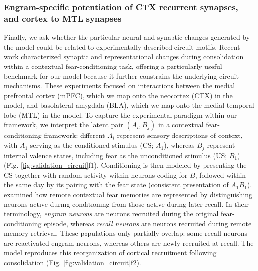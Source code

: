 \documentclass{article}
\begin{document}
\subsubsection*{Engram-specific potentiation of CTX recurrent synapses, and cortex to MTL synapses}
Finally, we ask whether the particular neural and synaptic changes generated by the model could be related to experimentally described circuit motifs. Recent work  characterized synaptic and representational changes during consolidation within a contextual fear-conditioning task, offering a particularly useful benchmark for our model because it further constrains the underlying circuit mechanisms. These experiments focused on interactions between the medial prefrontal cortex (mPFC), which we map onto the neocortex (CTX) in the model, and basolateral amygdala (BLA), which we map onto the medial temporal lobe (MTL) in the model. To capture the experimental paradigm within our framework, we interpret the latent pair $(A_i,B_j)$ in a contextual fear-conditioning framework: different $A_i$ represent sensory descriptions of context, with $A_1$ serving as the conditioned stimulus (CS; $A_1$), whereas $B_j$ represent internal valence states, including fear as the unconditioned stimulus (US; $B_1$) (Fig. \ref{fig:validation_circuit}f1). Conditioning is then modeled by presenting the CS together with random activity within neurons coding for $B$, followed within the same day by its pairing with the fear state (consistent presentation of $A_1B_1$).
\newline\newline
{} examined how remote contextual fear memories are represented by distinguishing neurons active during conditioning from those active during later recall. In their terminology, \emph{engram neurons} are neurons recruited during the original fear-conditioning episode, whereas \emph{recall neurons} are neurons recruited during remote memory retrieval. These populations only partially overlap: some recall neurons are reactivated engram neurons, whereas others are newly recruited at recall. The model reproduces this reorganization of cortical recruitment following consolidation (Fig. \ref{fig:validation_circuit}f2).
\newline\newline
\end{document}
